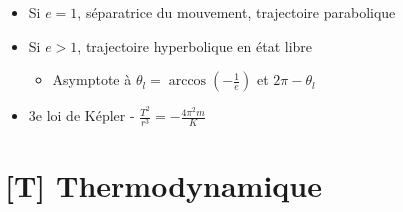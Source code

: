 \documentclass[openany]{book}
\begin{document}
\begin{itemize}
\begin{itemize}
\begin{itemize}
\begin{itemize}
                \item Demi grand-axe $a = \frac{r_A + r_P}{2} = \frac{p}{1-e^2}$
                \item Constante des aires $C = r_A v_A = r_P v_P$ (vitesses radiales nulles)
                \item $E_{m\repr} = \frac{K}{2a}$ [Démonstration - soustraire $r_A^2 E_{m\repr}$ et $r_P^2 E_{m\repr}$]
            \end{itemize}
            \item Si $e=1$, séparatrice du mouvement, trajectoire parabolique
            \item Si $e>1$, trajectoire hyperbolique en état libre
            \begin{itemize}
                \item Asymptote à $\theta_l = \arccos (-\frac{1}{e})$ et $2\pi - \theta_l$
            \end{itemize}
        \item 3e loi de Képler - $\frac{T^2}{r^3} = -\frac{4 \pi^2 m}{K}$
        \end{itemize}
    \end{itemize}
\end{itemize}

\clearpage
\chapter{[T] Thermodynamique}
\end{document}
